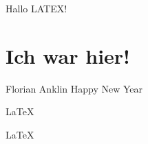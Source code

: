 \documentclass{article}
\begin{document}
Hallo LATEX!  
\chapter{Ich war hier!}
Florian Anklin
Happy New Year

\LaTeX 

\huge
\LaTeX 
   
\end{document}
